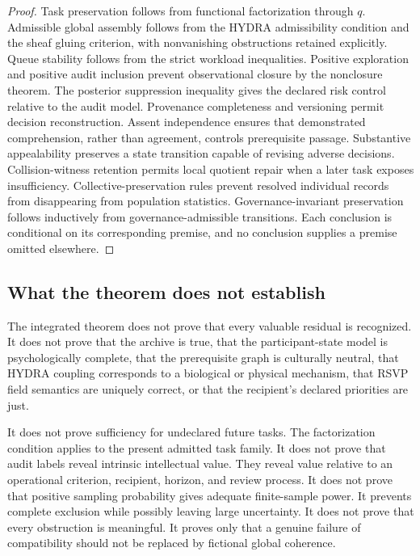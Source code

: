 \documentclass[11pt]{article}
\theoremstyle{definition}
\begin{document}
\begin{proof}
Task preservation follows from functional factorization through \(q\). Admissible global assembly follows from the HYDRA admissibility condition and the sheaf gluing criterion, with nonvanishing obstructions retained explicitly. Queue stability follows from the strict workload inequalities. Positive exploration and positive audit inclusion prevent observational closure by the nonclosure theorem. The posterior suppression inequality gives the declared risk control relative to the audit model. Provenance completeness and versioning permit decision reconstruction. Assent independence ensures that demonstrated comprehension, rather than agreement, controls prerequisite passage. Substantive appealability preserves a state transition capable of revising adverse decisions. Collision-witness retention permits local quotient repair when a later task exposes insufficiency. Collective-preservation rules prevent resolved individual records from disappearing from population statistics. Governance-invariant preservation follows inductively from governance-admissible transitions. Each conclusion is conditional on its corresponding premise, and no conclusion supplies a premise omitted elsewhere.
\end{proof}

\subsection{What the theorem does not establish}

The integrated theorem does not prove that every valuable residual is recognized. It does not prove that the archive is true, that the participant-state model is psychologically complete, that the prerequisite graph is culturally neutral, that HYDRA coupling corresponds to a biological or physical mechanism, that RSVP field semantics are uniquely correct, or that the recipient's declared priorities are just.

It does not prove sufficiency for undeclared future tasks. The factorization condition applies to the present admitted task family. It does not prove that audit labels reveal intrinsic intellectual value. They reveal value relative to an operational criterion, recipient, horizon, and review process. It does not prove that positive sampling probability gives adequate finite-sample power. It prevents complete exclusion while possibly leaving large uncertainty. It does not prove that every obstruction is meaningful. It proves only that a genuine failure of compatibility should not be replaced by fictional global coherence.
\end{document}
